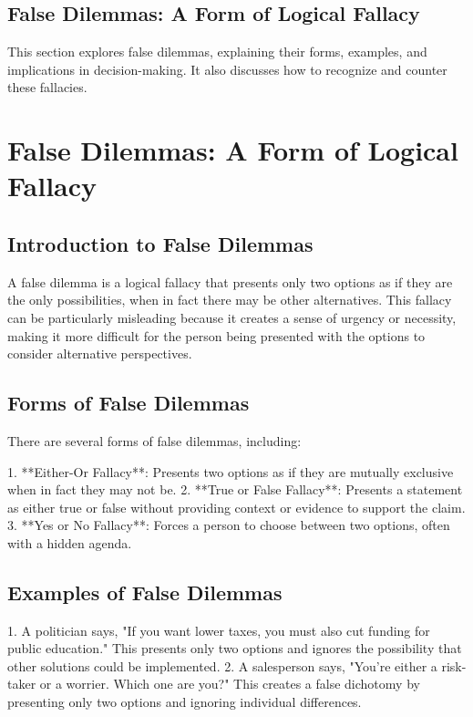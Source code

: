 \documentclass{report}%
\begin{document}
{{{{{{{{{{{{{{\section{False Dilemmas: A Form of Logical Fallacy}%
This section explores false dilemmas, explaining their forms, examples, and implications in decision-making. It also discusses how to recognize and counter these fallacies.

%
\chapter{False Dilemmas: A Form of Logical Fallacy}

\section{Introduction to False Dilemmas}

A false dilemma is a logical fallacy that presents only two options as if they are the only possibilities, when in fact there may be other alternatives. This fallacy can be particularly misleading because it creates a sense of urgency or necessity, making it more difficult for the person being presented with the options to consider alternative perspectives.

\section{Forms of False Dilemmas}

There are several forms of false dilemmas, including:

1. **Either-Or Fallacy**: Presents two options as if they are mutually exclusive when in fact they may not be.
2. **True or False Fallacy**: Presents a statement as either true or false without providing context or evidence to support the claim.
3. **Yes or No Fallacy**: Forces a person to choose between two options, often with a hidden agenda.

\section{Examples of False Dilemmas}

1. A politician says, "If you want lower taxes, you must also cut funding for public education." This presents only two options and ignores the possibility that other solutions could be implemented.
2. A salesperson says, "You're either a risk-taker or a worrier. Which one are you?" This creates a false dichotomy by presenting only two options and ignoring individual differences.

}}}}}}}}}}}}}}
\end{document}
